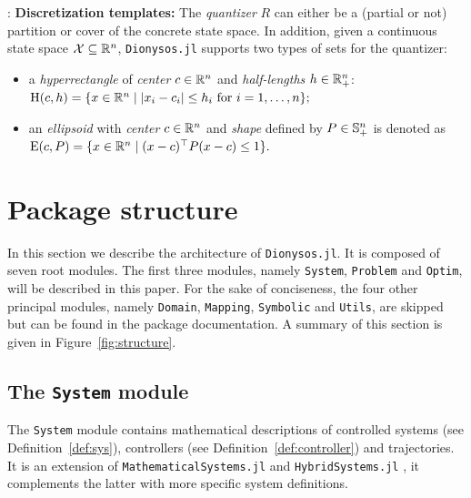 \documentclass{juliacon}
\begin{document}
:
\vskip 6pt
\textbf{Discretization templates:} The \emph{quantizer} $R$ can either be a (partial or not) partition or cover of the concrete state space. In addition, given a continuous state space $\mathcal{X}\subseteq \mathbb{R}^n$, \texttt{Dionysos.jl} supports two types of sets for the quantizer:
\begin{itemize}
    \item a \emph{hyperrectangle} of \emph{center} $ c\in\mathbb{R}^n$ and \emph{half-lengths} $h\in \mathbb{R}^n_{+}$: $\operatorname{H}(c,h) = \{x\in\mathbb{R}^n \mid |x_i-c_i|\le h_i \text{ for }i=1,\ldots,n\};$
    \item an \emph{ellipsoid} with \emph{center} $c\in\mathbb{R}^n$ and \emph{shape} defined by $P\in \mathbb{S}_{+}^{n}$ is denoted as $\operatorname{E}(c,P) =  \{x\in\mathbb{R}^n\mid (x-c)^\top P(x-c) \le 1\}.$
\end{itemize}

\section{Package structure}
\label{sec:package}

In this section we describe the architecture of \texttt{Dionysos.jl}. It is composed of seven root modules. The first three modules, namely \texttt{System}, \texttt{Problem} and \texttt{Optim}, will be described in this paper. For the sake of conciseness, the four other principal modules, namely \texttt{Domain}, \texttt{Mapping}, \texttt{Symbolic} and \texttt{Utils}, are skipped but can be found in the package documentation. A summary of this section is given in Figure~\ref{fig:structure}.

\subsection{The \texttt{System} module}

The \texttt{System} module contains mathematical descriptions of controlled systems (see Definition~\ref{def:sys}), controllers (see Definition~\ref{def:controller}) and trajectories. It is an extension of \texttt{MathematicalSystems.jl} and \texttt{HybridSystems.jl} \cite{BenoitLegat2024}, it complements the latter with more specific system definitions.

\vskip 6pt
\end{document}
